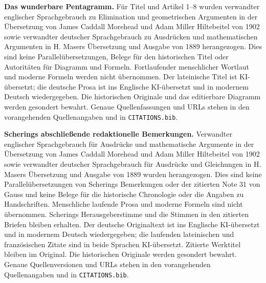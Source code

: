 \par\endgroup\clearpage
\thispagestyle{empty}\begingroup\fontsize{9}{9.5}\selectfont\raggedright
{}\medskip
\textbf{Das wunderbare Pentagramm.} Für Titel und Artikel 1--8 wurden verwandter englischer Sprachgebrauch zu Elimination und geometrischen Argumenten in der Übersetzung von James Caddall Morehead und Adam Miller Hiltebeitel von 1902 sowie verwandter deutscher Sprachgebrauch zu Ausdrücken und mathematischen Argumenten in H. Masers Übersetzung und Ausgabe von 1889 herangezogen. Dies sind keine Parallelübersetzungen, Belege für den historischen Titel oder Autoritäten für Diagramm und Formeln. Fortlaufender menschlicher Wortlaut und moderne Formeln werden nicht übernommen. Der lateinische Titel ist KI-übersetzt; die deutsche Prosa ist ins Englische KI-übersetzt und in modernem Deutsch wiedergegeben. Die historischen Originale und das editierbare Diagramm werden gesondert bewahrt. Genaue Quellenfassungen und URLs stehen in den vorangehenden Quellenangaben und in \texttt{CITATIONS.bib}.
\par\endgroup\clearpage
\thispagestyle{empty}\begingroup\fontsize{9}{9.5}\selectfont\raggedright
{}\medskip
\textbf{Scherings abschließende redaktionelle Bemerkungen.} Verwandter englischer Sprachgebrauch für Ausdrücke und mathematische Argumente in der Übersetzung von James Caddall Morehead und Adam Miller Hiltebeitel von 1902 sowie verwandter deutscher Sprachgebrauch für Ausdrücke und Gleichungen in H. Masers Übersetzung und Ausgabe von 1889 wurden herangezogen. Dies sind keine Parallelübersetzungen von Scherings Bemerkungen oder der zitierten Note 31 von Gauss und keine Belege für die historische Chronologie oder die Angaben zu Handschriften. Menschliche laufende Prosa und moderne Formeln sind nicht übernommen. Scherings Herausgeberstimme und die Stimmen in den zitierten Briefen bleiben erhalten. Der deutsche Originaltext ist ins Englische KI-übersetzt und in modernem Deutsch wiedergegeben; die laufenden lateinischen und französischen Zitate sind in beide Sprachen KI-übersetzt. Zitierte Werktitel bleiben im Original. Die historischen Originale werden gesondert bewahrt. Genaue Quellenversionen und URLs stehen in den vorangehenden Quellenangaben und in \texttt{CITATIONS.bib}.
\par\endgroup\clearpage
\thispagestyle{empty}\begingroup\fontsize{9}{9.5}\selectfont\raggedright
